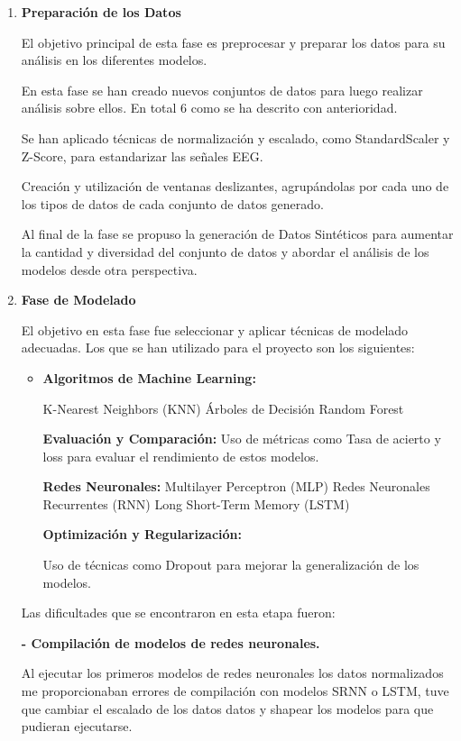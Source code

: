 \begin{enumerate}
\item
\textbf{Preparación de los Datos}

El objetivo principal de esta fase es preprocesar y preparar los datos para su análisis en los diferentes modelos.

En esta fase se han creado nuevos conjuntos de datos para luego realizar análisis sobre ellos. En total 6 como se ha descrito con anterioridad.

Se han aplicado técnicas de normalización y escalado, como StandardScaler y Z-Score, para estandarizar las señales EEG.

Creación y utilización de ventanas deslizantes, agrupándolas por cada uno de los tipos de datos de cada conjunto de datos generado.

Al final de la fase se propuso la generación de Datos Sintéticos para aumentar la cantidad y diversidad del conjunto de datos y abordar el análisis de los modelos desde otra perspectiva.

\item
\textbf{Fase de Modelado}

El objetivo en esta fase fue seleccionar y aplicar técnicas de modelado adecuadas. Los que se han utilizado para el proyecto son los siguientes:

	\begin{itemize}
	
	\item
	\textbf{Algoritmos de Machine Learning:}

	K-Nearest Neighbors (KNN)
	Árboles de Decisión
	Random Forest

	\textbf{Evaluación y Comparación:}
	Uso de métricas como Tasa de acierto y loss para evaluar el rendimiento de estos modelos.

	\textbf{Redes Neuronales:}
	Multilayer Perceptron (MLP)
	Redes Neuronales Recurrentes (RNN)
	Long Short-Term Memory (LSTM)

	\textbf{Optimización y Regularización:} 

	Uso de técnicas como Dropout para mejorar la generalización de los modelos.
	\end{itemize}


Las dificultades que se encontraron en esta etapa fueron:

\textbf{- Compilación de modelos de redes neuronales. }

	Al ejecutar los primeros modelos de redes neuronales los datos normalizados me proporcionaban errores de compilación con modelos SRNN o LSTM, tuve que cambiar el escalado de los datos datos y shapear los modelos para que pudieran ejecutarse.


\end{enumerate}
